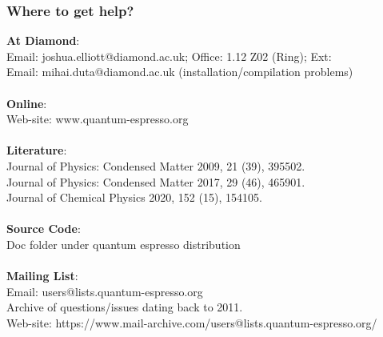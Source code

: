 \documentclass{beamer}
\begin{document}
\begin{frame}
\footnotesize
\frametitle{Where to get help?}

\alert{\textbf{At Diamond}}:\\
Email: joshua.elliott@diamond.ac.uk; Office: 1.12 Z02 (Ring); Ext:\\
Email: mihai.duta@diamond.ac.uk (installation/compilation problems)\\~\\

\textbf{Online}:\\
Web-site: www.quantum-espresso.org\\~\\

\textbf{Literature}:\\
Journal of Physics: Condensed Matter 2009, 21 (39), 395502.\\
Journal of Physics: Condensed Matter 2017, 29 (46), 465901.\\
Journal of Chemical Physics 2020, 152 (15), 154105.\\~\\

\textbf{Source Code}:\\
Doc folder under quantum espresso distribution\\~\\

\textbf{Mailing List}:\\
Email: users@lists.quantum-espresso.org\\
Archive of questions/issues dating back to 2011.\\
Web-site: https://www.mail-archive.com/users@lists.quantum-espresso.org/
\end{frame}
\end{document}
